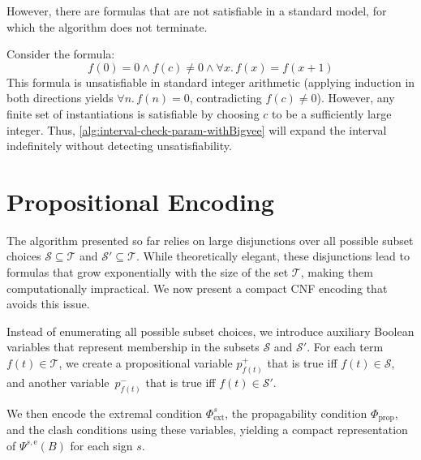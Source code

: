 \documentclass[runningheads]{llncs}
\begin{document}
However, there are formulas that are not satisfiable in a standard model, for which the algorithm does not terminate.

\begin{example}
Consider the formula:
\[
f(0) = 0 \land f(c) \neq 0 \land \forall x.\, f(x) = f(x+1)
\]
This formula is unsatisfiable in standard integer arithmetic (applying induction in both directions yields $\forall n.\, f(n) = 0$, contradicting $f(c) \neq 0$). However, any finite set of instantiations is satisfiable by choosing $c$ to be a sufficiently large integer. Thus, \cref{alg:interval-check-param-withBigvee} will expand the interval indefinitely without detecting unsatisfiability.
\end{example}


\section{Propositional Encoding}

The algorithm presented so far relies on large disjunctions over all possible subset choices $\mathcal{S}\subseteq\mathcal{T}$ and $\mathcal{S}'\subseteq\mathcal{T}$. While theoretically elegant, these disjunctions lead to formulas that grow exponentially with the size of the set $\mathcal{T}$, making them computationally impractical. We now present a compact CNF encoding that avoids this issue.

Instead of enumerating all possible subset choices, we introduce auxiliary Boolean variables that represent membership in the subsets $\mathcal{S}$ and $\mathcal{S}'$. For each term $f(t)\in\mathcal{T}$, we create a propositional variable 
$p_{f(t)}^+$ that is true iff $f(t) \in \mathcal{S}$, and another variable~$p_{f(t)}^-$ that is true iff $f(t) \in \mathcal{S}'$.

We then encode the extremal condition $\Phi^s_{\text{ext}}$, the propagability condition $\Phi_{\text{prop}}$, and the clash conditions using these variables, yielding a compact representation of $\Psi^{s,\text{e}}(B)$ for each sign $s$.
\end{document}
